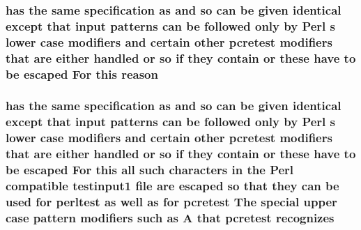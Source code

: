 \subsubsection[{\texorpdfstring{reason}{reason}}]{ has the same specification {\bf as} and {\bf so} {\bf can} {\bf be} {\bf given} {\bf identical} {\bf except} that {\bf input} {\bf patterns} {\bf can} {\bf be} followed only by {\bf Perl} {\bf s} lower {\bf case} {\bf modifiers} and certain other {\bf pcretest} {\bf modifiers} that {\bf are} either handled {\bf or} {\bf so} {\bf if} they contain {\bf or} these have {\bf to} {\bf be} escaped For {\bf this} reason}\hypertarget{perltest_8txt_accc58ff66e0025e508b912673edd4099}{}\label{perltest_8txt_accc58ff66e0025e508b912673edd4099}
\subsubsection[{\texorpdfstring{recognizes}{recognizes}}]{ has the same specification {\bf as} and {\bf so} {\bf can} {\bf be} {\bf given} {\bf identical} {\bf except} that {\bf input} {\bf patterns} {\bf can} {\bf be} followed only by {\bf Perl} {\bf s} lower {\bf case} {\bf modifiers} and certain other {\bf pcretest} {\bf modifiers} that {\bf are} either handled {\bf or} {\bf so} {\bf if} they contain {\bf or} these have {\bf to} {\bf be} escaped For {\bf this} {\bf all} such {\bf characters} {\bf in} the {\bf Perl} compatible testinput1 {\bf file} {\bf are} escaped {\bf so} that they {\bf can} {\bf be} {\bf used} for perltest {\bf as} well {\bf as} for {\bf pcretest} The {\bf special} {\bf upper} {\bf case} {\bf pattern} {\bf modifiers} such {\bf as} {\bf A} that {\bf pcretest} recognizes}\hypertarget{perltest_8txt_a86154bd3d49128ae45ae99235fd6249c}{}\label{perltest_8txt_a86154bd3d49128ae45ae99235fd6249c}
